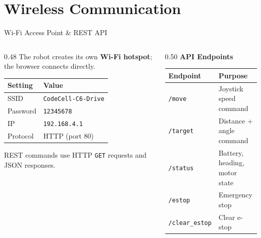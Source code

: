 \documentclass[aspectratio=169, 11pt]{beamer}
\begin{document}
\section{Wireless Communication}

\begin{frame}{Wi-Fi Access Point \& REST API}

  \begin{columns}[T]
    \begin{column}{0.48\textwidth}
      The robot creates its own \textbf{Wi-Fi hotspot};
      the browser connects directly.

      \medskip
      {\small
      \begin{tabular}{@{}ll@{}}
        \toprule
        Setting & Value \\
        \midrule
        SSID     & \texttt{CodeCell-C6-Drive} \\
        Password & \texttt{12345678} \\
        IP       & \texttt{192.168.4.1} \\
        Protocol & HTTP (port 80) \\
        \bottomrule
      \end{tabular}
      }

      \bigskip
      \smallskip
      {\small REST commands use HTTP \texttt{GET} requests and JSON responses.}
    \end{column}

    \begin{column}{0.50\textwidth}
      \textbf{API Endpoints}

      \smallskip
      {\small
      \begin{tabular}{@{}lp{3.9cm}@{}}
        \toprule
        Endpoint & Purpose \\
        \midrule
        \texttt{/move}        & Joystick speed command\\[3pt]
        \texttt{/target}      & Distance + angle command\\[3pt]
        \texttt{/status}      & Battery, heading, motor state\\[3pt]
        \texttt{/estop}       & Emergency stop\\[3pt]
        \texttt{/clear\_estop} & Clear e-stop \\
        \bottomrule
      \end{tabular}
      }
    \end{column}
  \end{columns}
\end{frame}
\end{document}
